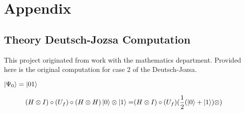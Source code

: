 \appendix
\section{Appendix}


\subsection{Theory Deutsch-Jozsa Computation}
    This project originated from work with the mathematics department. Provided here is the original computation for case 2 of the Deutsch-Jozsa.

\begin{comment}
    \tikzstyle{Hadamard} = {square, text centered, draw=black}
\begin{tikzpicture}[node distance = 2cm]
\end{tikzpicture}
\end{comment}
$\ket{\Psi_0} =\ket{0 1}$

\begin{align*}
    (H \otimes I) \circ (U_f) \circ (H \otimes H)\ket{0} \otimes \ket{1} = & (H \otimes I) \circ (U_f) ( \frac{1}{2} (\ket{0}+\ket{1}) \otimes )
\end{align*}

    

    